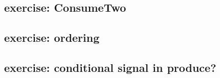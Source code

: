 
\subsection{exercise: ConsumeTwo}


\subsection{exercise: ordering}



\subsection{exercise: conditional signal in produce?}

